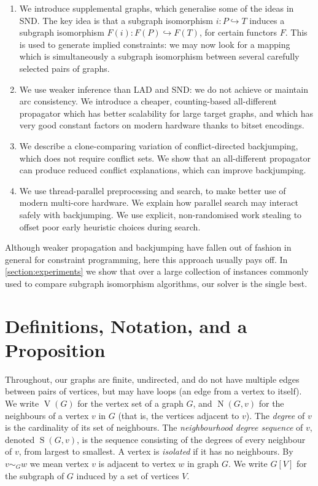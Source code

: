 \documentclass{llncs}
\begin{document}
\begin{enumerate}
    \item We introduce supplemental graphs, which generalise some of the ideas in SND. The key idea
        is that a subgraph isomorphism $i : P \hookrightarrow T$ induces a subgraph isomorphism
        $F(i) : F(P) \hookrightarrow F(T)$, for certain functors $F$.  This is used to generate
        implied constraints: we may now look for a mapping which is simultaneously a subgraph
        isomorphism between several carefully selected pairs of graphs.

    \item We use weaker inference than LAD and SND: we do not achieve or maintain arc consistency.
        We introduce a cheaper, counting-based all-different propagator which has better scalability
        for large target graphs, and which has very good constant factors on modern hardware thanks
        to bitset encodings.

    \item We describe a clone-comparing variation of conflict-directed backjumping, which does not
        require conflict sets. We show that an all-different propagator can produce reduced
        conflict explanations, which can improve backjumping.

    \item We use thread-parallel preprocessing and search, to make better use of modern multi-core
        hardware. We explain how parallel search may interact safely with backjumping. We use
        explicit, non-randomised work stealing to offset poor early heuristic choices during search.
\end{enumerate}

\noindent Although weaker propagation and backjumping have fallen out of fashion in general for
constraint programming, here this approach usually pays off. In \cref{section:experiments} we show
that over a large collection of instances commonly used to compare subgraph isomorphism algorithms,
our solver is the single best.

\section{Definitions, Notation, and a Proposition}

Throughout, our graphs are finite, undirected, and do not have multiple edges between pairs of
vertices, but may have loops (an edge from a vertex to itself). We write $\operatorname{V}(G)$ for
the vertex set of a graph $G$, and $\operatorname{N}(G, v)$ for the neighbours of a vertex $v$ in
$G$ (that is, the vertices adjacent to $v$).  The \emph{degree} of $v$ is the cardinality of its set
of neighbours. The \emph{neighbourhood degree sequence} of $v$, denoted $\operatorname{S}(G, v)$, is
the sequence consisting of the degrees of every neighbour of $v$, from largest to smallest.  A
vertex is \emph{isolated} if it has no neighbours. By $v \sim_G w$ we mean vertex $v$ is adjacent to
vertex $w$ in graph $G$. We write $G[V]$ for the subgraph of $G$ induced by a set of vertices $V$.
\end{document}
